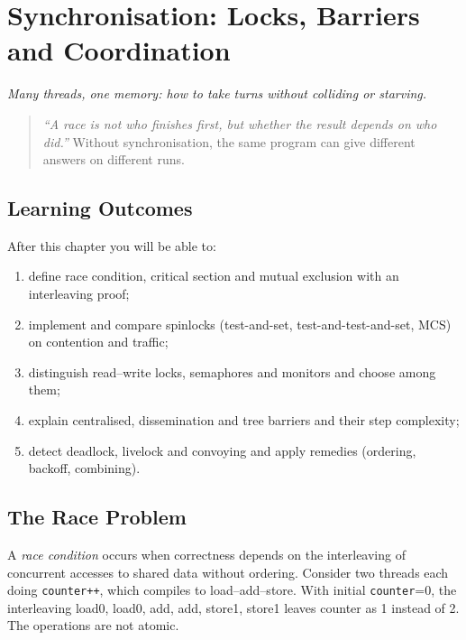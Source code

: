 \chapter{Synchronisation: Locks, Barriers and Coordination}\label{ch:sync}
\begin{center}\small\textit{Many threads, one memory: how to take turns without colliding or starving.}\end{center}

\begin{quote}
\emph{``A race is not who finishes first, but whether the result depends on who did.''} Without synchronisation, the same program can give different answers on different runs.
\end{quote}

\noindent{}
\vspace{0.4em}

\section*{Learning Outcomes}
After this chapter you will be able to:
\begin{enumerate}[label=(L\arabic*)]
    \item define race condition, critical section and mutual exclusion with an interleaving proof;
    \item implement and compare spinlocks (test-and-set, test-and-test-and-set, MCS) on contention and traffic;
    \item distinguish read--write locks, semaphores and monitors and choose among them;
    \item explain centralised, dissemination and tree barriers and their step complexity;
    \item detect deadlock, livelock and convoying and apply remedies (ordering, backoff, combining).
\end{enumerate}

\section{The Race Problem}\label{sec:race}
A \emph{race condition} occurs when correctness depends on the interleaving of concurrent accesses to shared data without ordering. Consider two threads each doing \texttt{counter++}, which compiles to load--add--store. With initial \texttt{counter}=0, the interleaving load0, load0, add, add, store1, store1 leaves counter as 1 instead of 2. The operations are not atomic.

